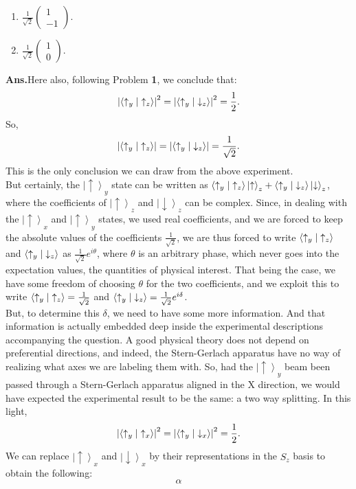 \documentclass[12pt]{article}
\newcommand\half{\frac{1}{2}}
\newcommand\lr{\left \langle}
\newcommand\rr{\right \rangle}
\newcommand\ls{\left |}
\newcommand\rs{\right |}
\newcommand\hs{\hat{S}}
\newcommand\tbf[1]{\textbf{#1}}
\newcommand\ua{\uparrow}
\newcommand\da{\downarrow}
\newcommand\rhalf{\frac{1}{\sqrt{2}}}
\newcommand\tans{\tbf{Ans.}}
\newcommand\usp{\ls \ua \rr}
\newcommand\dsp{\ls \da \rr}
\newcommand\sg{Stern-Gerlach }
\begin{document}
\begin{enumerate}[\bf 1.]
\begin{enumerate}[\bf I.]
\item $\rhalf \left(\begin{array}{c} 1 \\ -1 \end{array}\right)$.
\item $\rhalf \left(\begin{array}{c} 1 \\ 0 \end{array}\right)$.
\end{enumerate}
\vskip 1cm
\tans Here also, following Problem {\bf 1}, we conclude that:
$$
\ls \lr \ua _y \vphantom{.}\rs \left. \ua _z \rr \rs^2 = \ls \lr \ua _y \vphantom{.}\rs \left. \da _z \rr \rs^2 = \half.
$$
So,
$$
\ls \lr \ua _y \vphantom{.}\rs \left. \ua _z \rr \rs = \ls \lr \ua _y \vphantom{.}\rs \left. \da _z \rr \rs = \rhalf.
$$ 
This is the only conclusion we can draw from the above experiment. \\
But certainly, the $\usp_y$ state can be written as $\lr \ua _y \vphantom{.}\rs \left. \ua _z \rr \usp_z + \lr \ua _y \vphantom{.}\rs \left. \da _z \rr \dsp_z$, where the coefficients of $\usp_z$ and $\dsp_z$ can be complex. Since, in dealing with the $\usp_x$ and $\usp_y$ states, we used real coefficients, and we are forced to keep the absolute values of the coefficients $\rhalf$, we are thus forced to write $\lr \ua _y \vphantom{.}\rs \left. \ua _z \rr$ and $\lr \ua _y \vphantom{.}\rs \left. \da _z \rr$ as $\rhalf e^{i\theta}$, where $\theta$ is an arbitrary phase, which never goes into the expectation values, the quantities of physical interest. That being the case, we have some freedom of choosing $\theta$ for the two coefficients, and we exploit this to write $\lr \ua _y \vphantom{.}\rs \left. \ua _z \rr = \rhalf$ and $\lr \ua _y \vphantom{.}\rs \left. \da _z \rr= \rhalf e^{i\delta}$. \\
But, to determine this $\delta$, we need to have some more information. And that information is actually embedded deep inside the experimental descriptions accompanying the question. A good physical theory does not depend on preferential directions, and indeed, the \sg apparatus have no way of realizing what axes we are labeling them with. So, had the $\usp_y$ beam been passed through a \sg apparatus aligned in the X direction, we would have expected the experimental result to be the same: a two way splitting. In this light,
$$
\ls \lr \ua _y \vphantom{.}\rs \left. \ua _x \rr \rs^2 = \ls \lr \ua _y \vphantom{.}\rs \left. \da _x \rr \rs^2 = \half.
$$
\newpage
We can replace $\usp_x$ and $\dsp_x$ by their representations in the $\hs_z$ basis to obtain the following:
$$
\alpha
$$
\end{enumerate}
\end{document}
